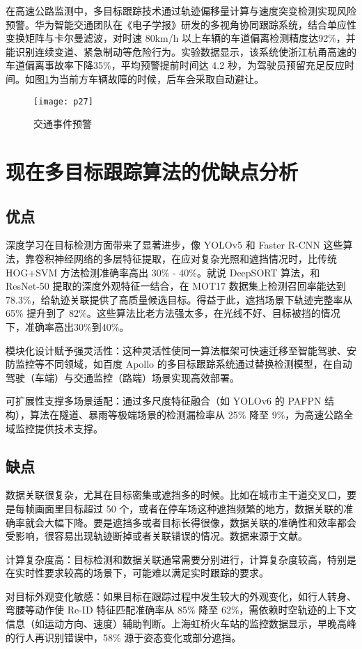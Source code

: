 在高速公路监测中，多目标跟踪技术通过轨迹偏移量计算与速度突变检测实现风险预警。华为智能交通团队在《电子学报》\cite{huawei2020highway}研发的多视角协同跟踪系统，结合单应性变换矩阵与卡尔曼滤波，对时速 80km/h 以上车辆的车道偏离检测精度达92\%，并能识别连续变道、紧急制动等危险行为。实验数据显示，该系统使浙江杭甬高速的车道偏离事故率下降35\%，平均预警提前时间达 4.2 秒，为驾驶员预留充足反应时间。如图\ref{fig:p27}为当前方车辆故障的时候，后车会采取自动避让。



\begin{figure}[htbp] %
	\centering
	\texttt{[image: p27]} %
	\caption{交通事件预警} %
	\label{fig:p27} %
\end{figure}




\section{现在多目标跟踪算法的优缺点分析}

\subsection{优点}
深度学习在目标检测方面带来了显著进步，像 YOLOv5 和 Faster R-CNN 这些算法，靠卷积神经网络的多层特征提取，在应对复杂光照和遮挡情况时，比传统 HOG+SVM 方法检测准确率高出 30\% - 40\%。就说 DeepSORT 算法，和 ResNet-50 提取的深度外观特征一结合，在 MOT17 数据集上检测召回率能达到 78.3\%，给轨迹关联提供了高质量候选目标。得益于此，遮挡场景下轨迹完整率从 65\% 提升到了 82\%。这些算法比老方法强太多，在光线不好、目标被挡的情况下，准确率高出30\%到40\%。

模块化设计赋予强灵活性：这种灵活性使同一算法框架可快速迁移至智能驾驶、安防监控等不同领域，如百度 Apollo 的多目标跟踪系统通过替换检测模型，在自动驾驶（车端）与交通监控（路端）场景实现高效部署\cite{apollo_tracking}。

可扩展性支撑多场景适配：通过多尺度特征融合（如 YOLOv6 的 PAFPN 结构），算法在隧道、暴雨等极端场景的检测漏检率从 25\% 降至 9\%，为高速公路全域监控提供技术支撑\cite{spatiotemporal_gnn}。	

\subsection{缺点}
数据关联很复杂，尤其在目标密集或遮挡多的时候。比如在城市主干道交叉口，要是每帧画面里目标超过 50 个，或者在停车场这种遮挡频繁的地方，数据关联的准确率就会大幅下降。要是遮挡多或者目标长得很像，数据关联的准确性和效率都会受影响，很容易出现轨迹断掉或者关联错误的情况。数据来源于文献\cite{wang2014unified}。

计算复杂度高：目标检测和数据关联通常需要分别进行，计算复杂度较高，特别是在实时性要求较高的场景下，可能难以满足实时跟踪的要求。

对目标外观变化敏感：如果目标在跟踪过程中发生较大的外观变化，如行人转身、弯腰等动作使 Re-ID 特征匹配准确率从 85\% 降至 62\%，需依赖时空轨迹的上下文信息（如运动方向、速度）辅助判断。上海虹桥火车站的监控数据显示，早晚高峰的行人再识别错误中，58\% 源于姿态变化或部分遮挡\cite{li2023pedestrian}。
















